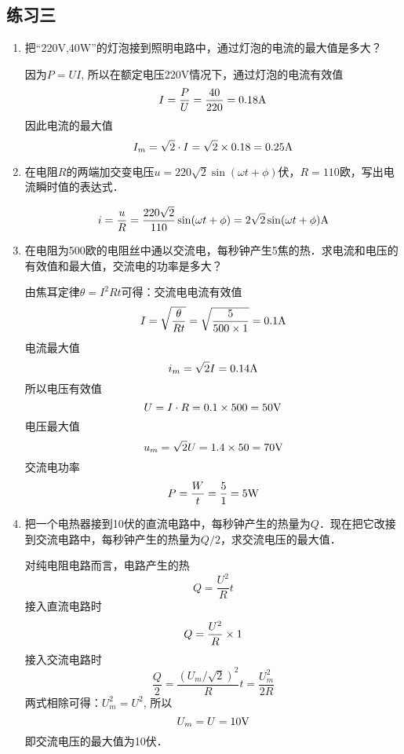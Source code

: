 \subsection{练习三}
\begin{enumerate}
    \item 把“220V,40W”的灯泡接到照明电路中，通过灯泡的电流的最大值是多大？


    \begin{solution}
        因为$P=UI$, 所以在额定电压220V情况下，通过灯泡的电流有效值
 \[I=\frac{P}{U} =\frac{40}{220}=0.18{\rm A}\]
        因此电流的最大值
        $$I_m=\sqrt{2}\cdot I=\sqrt{2}\times0.18=0.25{\rm A}$$
    \end{solution}
    
    \item 在电阻$R$的两端加交变电压$u=220\sqrt{2}\sin(\omega t+\phi)$伏，$R=110$欧，写出电流瞬时值的表达式．


    \begin{solution}
    \[i=\frac{u}{R}=\frac{220\sqrt{2}}{110}\sin(\omega t+\phi)=2\sqrt{2}\sin(\omega t+\phi){\rm A}\]
    \end{solution}
    
    \item 在电阻为500欧的电阻丝中通以交流电，每秒钟产生5焦的热．求电流和电压的有效值和最大值，交流电的功率是多大？


    \begin{solution}
        由焦耳定律$\theta=I^2Rt$可得：交流电电流有效值
    \[I=\sqrt{\frac{\theta}{Rt}}=\sqrt{\frac{5}{500\times 1}}=0.1{\rm A}\]
电流最大值
\[i_m=\sqrt{2}I=0.14{\rm A}\]
        所以电压有效值
$$U=I\cdot R=0.1\times500=50{\rm V}$$
电压最大值
\[u_m=\sqrt{2}U=1.4\times50=70{\rm V}\]
交流电功率
\[P=\frac{W}{t}=\frac{5}{1}=5{\rm W}\]
    \end{solution}
    
    \item 把一个电热器接到10伏的直流电路中，每秒钟产生的热量为$Q$．现在把它改接到交流电路中，每秒钟产生的热量为$Q/2$，求交流电压的最大值．

    \begin{solution}
        对纯电阻电路而言，电路产生的热$$Q=\frac{U^2}{R}t$$
        接入直流电路时
        \[Q=\frac{U^2}{R}\times 1\]
        接入交流电路时
     \[\frac{Q}{2}=\frac{(U_m/\sqrt{2})^2}{R}t=\frac{U^2_m}{2R}\]
        两式相除可得：$U^2_m=U^2$, 
        所以
   \[     U_m=U=10{\rm V}\]
        即交流电压的最大值为10伏．
    \end{solution}
    
\end{enumerate}

